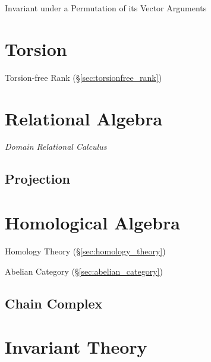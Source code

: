 Invariant under a Permutation of its Vector Arguments



\section{Torsion}\label{sec:torsion}

Torsion-free Rank (\S\ref{sec:torsionfree_rank})



\section{Relational Algebra}\label{sec:relational_algebra}

\emph{Domain Relational Calculus}

\subsection{Projection}\label{sec:relational_projection}



\section{Homological Algebra}\label{sec:homological_algebra}

Homology Theory (\S\ref{sec:homology_theory})

Abelian Category (\S\ref{sec:abelian_category})



\subsection{Chain Complex}\label{sec:chain_complex}



\section{Invariant Theory}\label{sec:invariant_theory}
